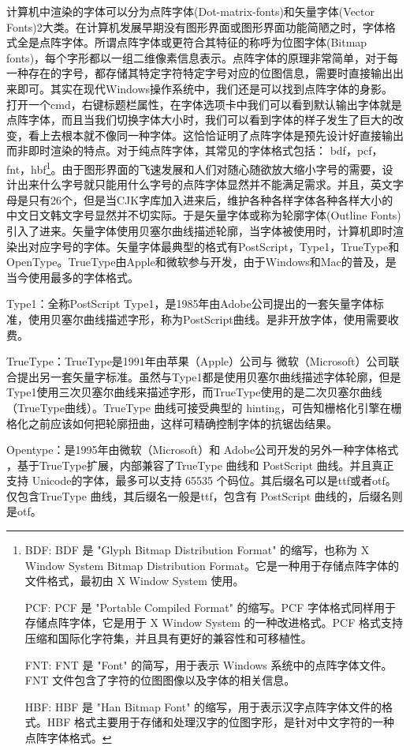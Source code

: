 \documentclass[../../../dolphin-book-2023.tex]{subfiles}
\begin{document}
计算机中渲染的字体可以分为点阵字体(Dot-matrix-fonts)和矢量字体(Vector Fonts)2大类。在计算机发展早期没有图形界面或图形界面功能简陋之时，字体格式全是点阵字体。所谓点阵字体或更符合其特征的称呼为位图字体(Bitmap fonts)，每个字形都以一组二维像素信息表示。点阵字体的原理非常简单，对于每一种存在的字号，都存储其特定字符特定字号对应的位图信息，需要时直接输出出来即可。其实在现代Windows操作系统中，我们还是可以找到点阵字体的身影。打开一个cmd，右键标题栏属性，在字体选项卡中我们可以看到默认输出字体就是点阵字体，而且当我们切换字体大小时，我们可以看到字体的样子发生了巨大的改变，看上去根本就不像同一种字体。这恰恰证明了点阵字体是预先设计好直接输出而非即时渲染的特点。对于纯点阵字体，其常见的字体格式包括： bdf，pcf，fnt，hbf\footnote{BDF: BDF 是 "Glyph Bitmap Distribution Format" 的缩写，也称为 X Window System Bitmap Distribution Format。它是一种用于存储点阵字体的文件格式，最初由 X Window System 使用。

PCF: PCF 是 "Portable Compiled Format" 的缩写。PCF 字体格式同样用于存储点阵字体，它是用于 X Window System 的一种改进格式。PCF 格式支持压缩和国际化字符集，并且具有更好的兼容性和可移植性。

FNT: FNT 是 "Font" 的简写，用于表示 Windows 系统中的点阵字体文件。FNT 文件包含了字符的位图图像以及字体的相关信息。

HBF: HBF 是 "Han Bitmap Font" 的缩写，用于表示汉字点阵字体文件的格式。HBF 格式主要用于存储和处理汉字的位图字形，是针对中文字符的一种点阵字体格式。}。由于图形界面的飞速发展和人们对随心随欲放大缩小字号的需要，设计出来什么字号就只能用什么字号的点阵字体显然并不能满足需求。并且，英文字母是只有26个，但是当CJK字库加入进来后，维护各种各样字体各种各样大小的中文日文韩文字号显然并不切实际。于是矢量字体或称为轮廓字体(Outline Fonts)引入了进来。矢量字体使用贝塞尔曲线描述轮廓，当字体被使用时，计算机即时渲染出对应字号的字体。矢量字体最典型的格式有PostScript，Type1，TrueType和OpenType。TrueType由Apple和微软参与开发，由于Windows和Mac的普及，是当今使用最多的字体格式。

Type1：全称PostScript Type1，是1985年由Adobe公司提出的一套矢量字体标准，使用贝塞尔曲线描述字形，称为PostScript曲线。是非开放字体，使用需要收费。

TrueType：TrueType是1991年由苹果（Apple）公司与 微软（Microsoft）公司联合提出另一套矢量字标准。虽然与Type1都是使用贝塞尔曲线描述字体轮廓，但是Type1使用三次贝塞尔曲线来描述字形，而TrueType使用的是二次贝塞尔曲线（TrueType曲线）。TrueType 曲线可接受典型的 hinting，可告知栅格化引擎在栅格化之前应该如何把轮廓扭曲，这样可精确控制字体的抗锯齿结果。

Opentype：是1995年由微软（Microsoft）和 Adobe公司开发的另外一种字体格式 ，基于TrueType扩展，内部兼容了TrueType 曲线和 PostScript 曲线。并且真正支持 Unicode的字体，最多可以支持 65535 个码位。其后缀名可以是ttf或者otf。仅包含TrueType 曲线，其后缀名一般是ttf，包含有 PostScript 曲线的，后缀名则是otf。
\end{document}
